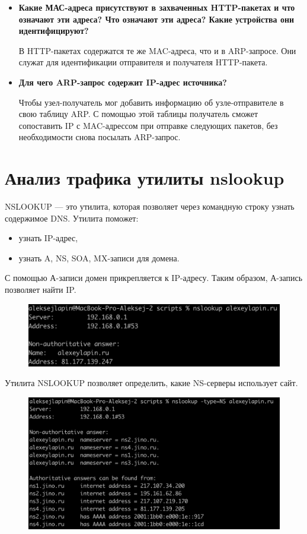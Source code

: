 \documentclass[12pt,onecolumn]{article}
\begin{document}
\begin{itemize}
{    }
    \item {
        \textbf{Какие МАС-адреса присутствуют в захваченных HTTP-пакетах и что означают эти адреса? Что означают эти адреса? Какие устройства они идентифицируют?}

        В HTTP-пакетах содержатся те же MAC-адреса, что и в ARP-запросе. Они служат для идентификации отправителя и получателя HTTP-пакета.
    }

    \item {
        \textbf{Для чего ARP-запрос содержит IP-адрес источника?}

        Чтобы узел-получатель мог добавить информацию об узле-отправителе в свою таблицу ARP. С помощью этой таблицы получатель сможет сопоставить IP с MAC-адрессом при отправке следующих пакетов, без необходимости снова посылать ARP-запрос. 
    }
\end{itemize}

\section{Анализ трафика утилиты nslookup}

NSLOOKUP — это утилита, которая позволяет через командную строку узнать содержимое DNS. Утилита поможет:
\begin{itemize}
    \item узнать IP-адрес,
    \item узнать A, NS, SOA, MX-записи для домена.
\end{itemize}

С помощью А-записи домен прикрепляется к IP-адресу. Таким образом, А-запись позволяет найти IP.

\begin{figure}[H]
    \centering
    \includegraphics*[width=\textwidth]{image/part6/nslookupa.png}
\end{figure}

Утилита NSLOOKUP позволяет определить, какие NS-серверы использует сайт.

\begin{figure}[H]
    \centering
    \includegraphics*[width=\textwidth]{image/part6/nslookupns.png}
\end{figure}
\end{document}
